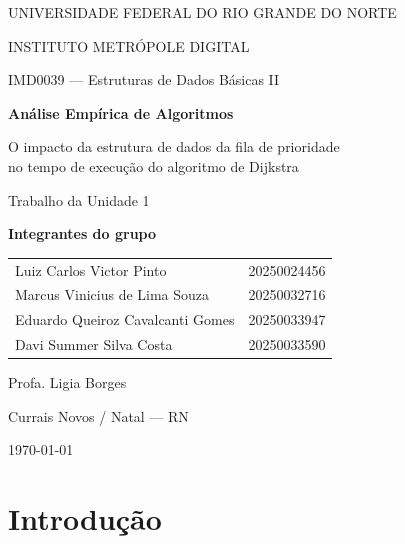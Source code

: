 \documentclass[12pt,a4paper]{article}
\begin{document}
\begin{titlepage}
\centering
\vspace*{1cm}

{\large UNIVERSIDADE FEDERAL DO RIO GRANDE DO NORTE\par}
{\large INSTITUTO METRÓPOLE DIGITAL\par}
\vspace{0.3cm}
{\large IMD0039 --- Estruturas de Dados Básicas II\par}

\vfill

{\Huge\bfseries Análise Empírica de Algoritmos\par}
\vspace{0.6cm}
{\LARGE O impacto da estrutura de dados da fila de prioridade\\ no tempo de execução do algoritmo de Dijkstra\par}

\vspace{1.2cm}
{\large Trabalho da Unidade 1\par}

\vfill

{\large\bfseries Integrantes do grupo\par}
\vspace{0.3cm}
\begin{tabular}{ll}
Luiz Carlos Victor Pinto & 20250024456 \\
Marcus Vinicius de Lima Souza & 20250032716 \\
Eduardo Queiroz Cavalcanti Gomes & 20250033947 \\
Davi Summer Silva Costa & 20250033590 \\
\end{tabular}

\vspace{1.2cm}
{\large Profa. Ligia Borges\par}

\vfill
{\large Currais Novos / Natal --- RN\par}
{\large \today\par}
\end{titlepage}

\onehalfspacing
{}
\tableofcontents
\newpage
{}

\section{Introdução}
\end{document}

